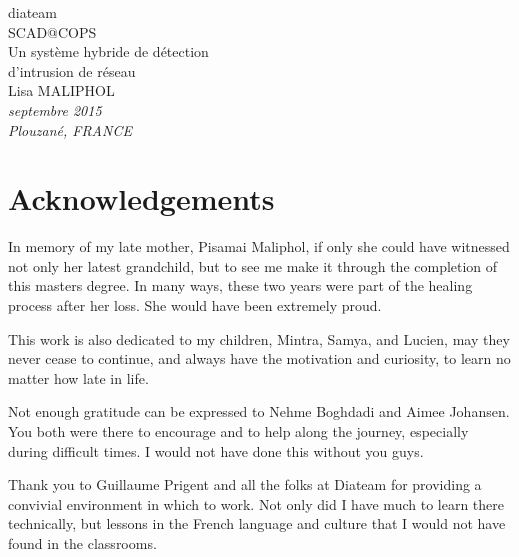 \documentclass[11pt,a4paper]{article}
\begin{document}
\begin{center}

\vspace{30mm}

{\Huge diateam}\\
\bigskip
{\Huge SCAD@COPS}\\
\bigskip
\bigskip
{\Huge Un système hybride de détection}\\
{\Huge d’intrusion de réseau }\\

\vspace{30mm}
{\huge Lisa MALIPHOL}\\

\vspace{75mm}
\textit{septembre 2015}\\
\medskip
\textit{Plouzané, FRANCE}\\

\end{center}

\thispagestyle{empty} \newpage
\mbox{} \thispagestyle{empty}

\newpage

\section*{Acknowledgements}\label{acknowledgements}

In memory of my late mother, Pisamai Maliphol, if only she could have
witnessed not only her latest grandchild, but to see me make it through
the completion of this masters degree. In many ways, these two years
were part of the healing process after her loss. She would have been
extremely proud.

This work is also dedicated to my children, Mintra, Samya, and Lucien,
may they never cease to continue, and always have the motivation and
curiosity, to learn no matter how late in life.

Not enough gratitude can be expressed to Nehme Boghdadi and Aimee
Johansen. You both were there to encourage and to help along the
journey, especially during difficult times. I would not have done this
without you guys.

Thank you to Guillaume Prigent and all the folks at Diateam for
providing a convivial environment in which to work. Not only did I have
much to learn there technically, but lessons in the French language and
culture that I would not have found in the classrooms.
\end{document}
